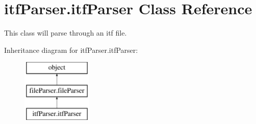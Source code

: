 \hypertarget{classitf_parser_1_1itf_parser}{\section{itf\-Parser.\-itf\-Parser Class Reference}
\label{classitf_parser_1_1itf_parser}
}


This class will parse through an itf file.  


Inheritance diagram for itf\-Parser.\-itf\-Parser\-:\begin{figure}[H]
\begin{center}
\leavevmode
\includegraphics[height=3.000000cm]{classitf_parser_1_1itf_parser}
\end{center}
\end{figure}
